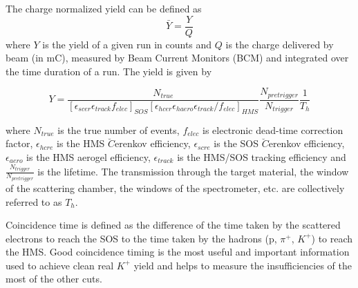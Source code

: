 %
The charge normalized yield can be defined as 
\begin{equation}
\bar{Y} = \frac{Y}{Q}
\end{equation}
where $Y$ is the yield of a given run in counts and $Q$ is the charge delivered by beam (in mC), measured by Beam Current Monitors (BCM) and integrated over the time duration of a run. The yield is given by

\begin{equation} \label{equ:yield}
Y = \frac{N_{true}}{[\epsilon_{scer}\epsilon_{track}f_{elec}]_{SOS}[\epsilon_{hcer}\epsilon_{haero}\epsilon_{track}/f_{elec}]_{HMS}}\frac{N_{pretrigger}}{N_{trigger}}\frac{1}{T_h}
\end{equation}

\noindent
where $N_{true}$ is the true number of events, $f_{elec}$ is electronic dead-time correction factor, $\epsilon_{hcre}$ is the HMS $\breve{C}$erenkov efficiency, $\epsilon_{scre}$ is the SOS $\breve{C}$erenkov efficiency, $\epsilon_{aero}$ is the HMS aerogel efficiency, $\epsilon_{track}$ is the HMS/SOS tracking efficiency and $\frac{N_{trigger}}{N_{pretrigger}}$ is the lifetime. The transmission through the target material, the window of the scattering chamber, the windows of the spectrometer, etc. are collectively referred to as $T_h$.

%
Coincidence time is defined as the difference of the time taken by the scattered electrons to reach the SOS to the time taken by the hadrons (p, $\pi^+$, $K^+$) to reach the HMS. Good coincidence timing is the most useful and important information used to achieve clean real $K^+$ yield and helps to measure the insufficiencies of the most of the other cuts.


